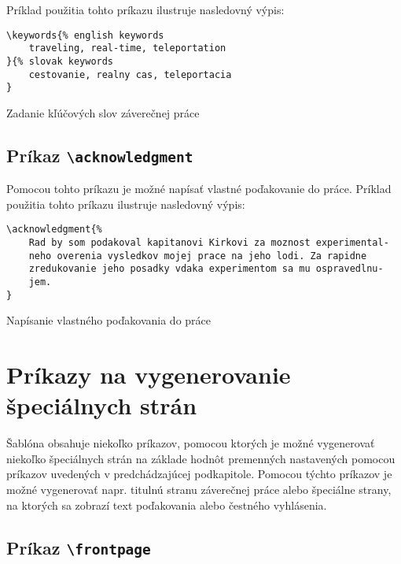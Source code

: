 Príklad použitia tohto príkazu ilustruje nasledovný výpis:

\begin{listing}[ht!]
\begin{verbatim}
\keywords{% english keywords
    traveling, real-time, teleportation
}{% slovak keywords
    cestovanie, realny cas, teleportacia
}
\end{verbatim}
\caption{Zadanie kľúčových slov záverečnej práce}
\end{listing}


\subsection{Príkaz {\tt \textbackslash{}acknowledgment}}

Pomocou tohto príkazu je možné napísať vlastné poďakovanie do práce. Príklad použitia tohto príkazu ilustruje nasledovný výpis:

\begin{listing}[ht!]
\begin{verbatim}
\acknowledgment{%
    Rad by som podakoval kapitanovi Kirkovi za moznost experimental-
    neho overenia vysledkov mojej prace na jeho lodi. Za rapidne 
    zredukovanie jeho posadky vdaka experimentom sa mu ospravedlnu-
    jem.
}
\end{verbatim}
\caption{Napísanie vlastného poďakovania do práce}
\end{listing}



\section{Príkazy na vygenerovanie špeciálnych strán}

Šablóna obsahuje niekoľko príkazov, pomocou ktorých je možné vygenerovať niekoľko špeciálnych strán na základe hodnôt premenných nastavených pomocou príkazov uvedených v predchádzajúcej podkapitole. Pomocou týchto príkazov je možné vygenerovať napr. titulnú stranu záverečnej práce alebo špeciálne strany, na ktorých sa zobrazí text poďakovania alebo čestného vyhlásenia.

\subsection{Príkaz {\tt \textbackslash{}frontpage}}

